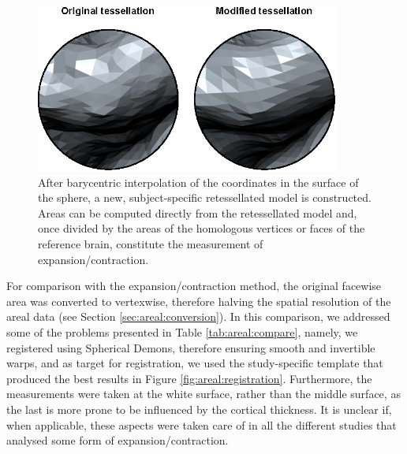 \begin{figure}[!tbp]  %
\centering
\includegraphics[width=10cm]{images/retessellate.eps}
\caption[Example of a retessellated surface.]{After barycentric interpolation of the coordinates in the surface of the sphere, a new, subject-specific retessellated model is constructed. Areas can be computed directly from the retessellated model and, once divided by the areas of the homologous vertices or faces of the reference brain, constitute the measurement of expansion/contraction.}
\label{fig:areal:retessellate}
\end{figure}

For comparison with the expansion/contraction method, the original facewise area was converted to vertexwise, therefore halving the spatial resolution of the areal data (see Section \ref{sec:areal:conversion}). In this comparison, we addressed some of the problems presented in Table \ref{tab:areal:compare}, namely, we registered using Spherical Demons, therefore ensuring smooth and invertible warps, and as target for registration, we used the study-specific template that produced the best results in Figure \ref{fig:areal:registration}. Furthermore, the measurements were taken at the white surface, rather than the middle surface, as the last is more prone to be influenced by the cortical thickness. It is unclear if, when applicable, these aspects were taken care of in all the different studies that analysed some form of expansion/contraction.

